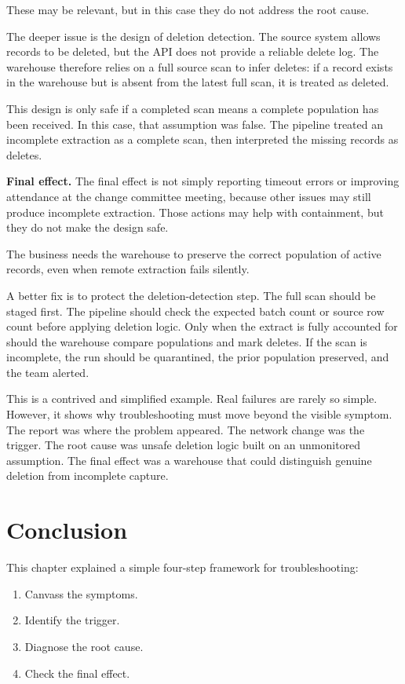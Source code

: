 \documentclass[10pt,openany,10pt]{book}
\providecommand{\tightlist}{%
  \setlength{\itemsep}{0pt}\setlength{\parskip}{0pt}}
\begin{document}
These may be relevant, but in this case they do not address the root
cause.

The deeper issue is the design of deletion detection. The source system
allows records to be deleted, but the API does not provide a reliable
delete log. The warehouse therefore relies on a full source scan to
infer deletes: if a record exists in the warehouse but is absent from
the latest full scan, it is treated as deleted.

This design is only safe if a completed scan means a complete population
has been received. In this case, that assumption was false. The pipeline
treated an incomplete extraction as a complete scan, then interpreted
the missing records as deletes.

\textbf{Final effect.} The final effect is not simply reporting timeout
errors or improving attendance at the change committee meeting, because
other issues may still produce incomplete extraction. Those actions may
help with containment, but they do not make the design safe.

The business needs the warehouse to preserve the correct population of
active records, even when remote extraction fails silently.

A better fix is to protect the deletion-detection step. The full scan
should be staged first. The pipeline should check the expected batch
count or source row count before applying deletion logic. Only when the
extract is fully accounted for should the warehouse compare populations
and mark deletes. If the scan is incomplete, the run should be
quarantined, the prior population preserved, and the team alerted.

This is a contrived and simplified example. Real failures are rarely so
simple. However, it shows why troubleshooting must move beyond the
visible symptom. The report was where the problem appeared. The network
change was the trigger. The root cause was unsafe deletion logic built
on an unmonitored assumption. The final effect was a warehouse that
could distinguish genuine deletion from incomplete capture.

\section{Conclusion}\label{conclusion-8}

This chapter explained a simple four-step framework for troubleshooting:

\begin{enumerate}
\def\labelenumi{\arabic{enumi}.}
\tightlist
\item
  Canvass the symptoms.
\item
  Identify the trigger.
\item
  Diagnose the root cause.
\item
  Check the final effect.
\end{enumerate}
\end{document}
